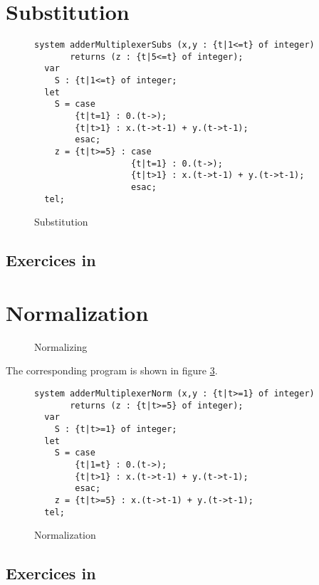 %
\section{Substitution}
\begin{figure}[htbp]
%
\begin{verbatim}
system adderMultiplexerSubs (x,y : {t|1<=t} of integer)
       returns (z : {t|5<=t} of integer);
  var
    S : {t|1<=t} of integer;
  let
    S = case
        {t|t=1} : 0.(t->);
        {t|t>1} : x.(t->t-1) + y.(t->t-1);
        esac;
    z = {t|t>=5} : case
                   {t|t=1} : 0.(t->);
                   {t|t>1} : x.(t->t-1) + y.(t->t-1);
                   esac;
  tel;
\end{verbatim}
\caption{Substitution}\label{adderMultiplexerSubs-alpha}
\end{figure}
\subsection*{Exercices in {\mma}}

%
\section{Normalization}
\begin{figure}[htbp]
\centerline{}
\caption{Normalizing}\label{adderMultiplexerNorm}
\end{figure}
The corresponding program is shown in figure \ref{adderMultiplexerNorm-alpha}.
\begin{figure}[htbp]
%
\begin{verbatim}
system adderMultiplexerNorm (x,y : {t|t>=1} of integer)
       returns (z : {t|t>=5} of integer);
  var
    S : {t|t>=1} of integer;
  let
    S = case
        {t|1=t} : 0.(t->);
        {t|t>1} : x.(t->t-1) + y.(t->t-1);
        esac;
    z = {t|t>=5} : x.(t->t-1) + y.(t->t-1);
  tel;
\end{verbatim}
\caption{Normalization}\label{adderMultiplexerNorm-alpha}
\end{figure}
\subsection*{Exercices in {\mma}}

